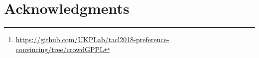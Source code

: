 \documentclass[smallcondensed,natbib]{svjour3}     %
\begin{document}
\begin{abstract}
work\footnote{\url{https://github.com/UKPLab/tacl2018-preference-convincing/tree/crowdGPPL}}.
\end{abstract}

%






%




\section*{Acknowledgments}




\appendix


\end{document}
